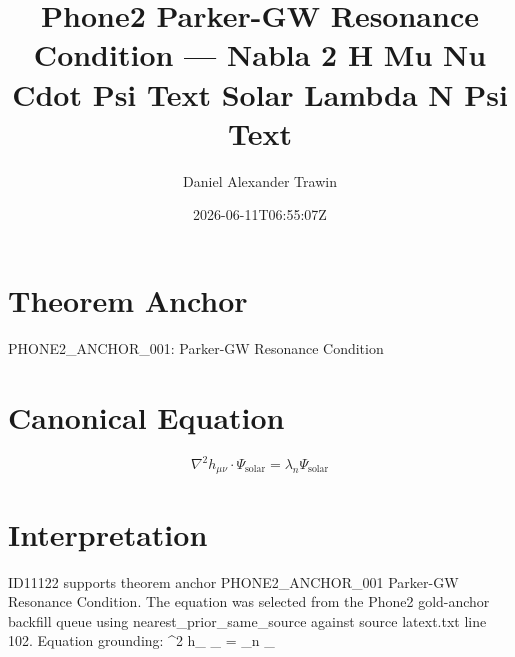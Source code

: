 \documentclass[11pt]{article}
\title{Phone2 Parker-GW Resonance Condition — Nabla 2 H Mu Nu Cdot Psi Text Solar Lambda N Psi Text}
\author{Daniel Alexander Trawin}
\date{2026-06-11T06:55:07Z}
\begin{document}
\maketitle
\section*{Theorem Anchor}
PHONE2_ANCHOR_001: Parker-GW Resonance Condition
\section*{Canonical Equation}
\[
\nabla^2 h_{\mu\nu} \cdot \Psi_{\text{solar}} = \lambda_n \Psi_{\text{solar}}
\]
\section*{Interpretation}
ID11122 supports theorem anchor PHONE2_ANCHOR_001 Parker-GW Resonance Condition. The equation was selected from the Phone2 gold-anchor backfill queue using nearest_prior_same_source against source latext.txt line 102. Equation grounding: \nabla^2 h_{\mu\nu} \cdot \Psi_{} = \lambda_n \Psi_{}
\end{document}
